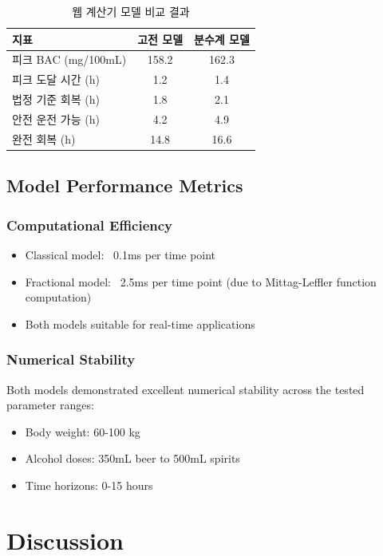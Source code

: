 \documentclass[11pt]{article}
\begin{document}
\begin{table}[H]
\centering
\caption{웹 계산기 모델 비교 결과}
\begin{tabular}{|l|c|c|}
\hline
\textbf{지표} & \textbf{고전 모델} & \textbf{분수계 모델} \\
\hline
피크 BAC (mg/100mL) & 158.2 & 162.3 \\
피크 도달 시간 (h) & 1.2 & 1.4 \\
법정 기준 회복 (h) & 1.8 & 2.1 \\
안전 운전 가능 (h) & 4.2 & 4.9 \\
완전 회복 (h) & 14.8 & 16.6 \\
\hline
\end{tabular}
\end{table}

\subsection{Model Performance Metrics}

\subsubsection{Computational Efficiency}
\begin{itemize}
    \item Classical model: ~0.1ms per time point
    \item Fractional model: ~2.5ms per time point (due to Mittag-Leffler function computation)
    \item Both models suitable for real-time applications
\end{itemize}

\subsubsection{Numerical Stability}
Both models demonstrated excellent numerical stability across the tested parameter ranges:
\begin{itemize}
    \item Body weight: 60-100 kg
    \item Alcohol doses: 350mL beer to 500mL spirits
    \item Time horizons: 0-15 hours
\end{itemize}

\section{Discussion}
\end{document}
